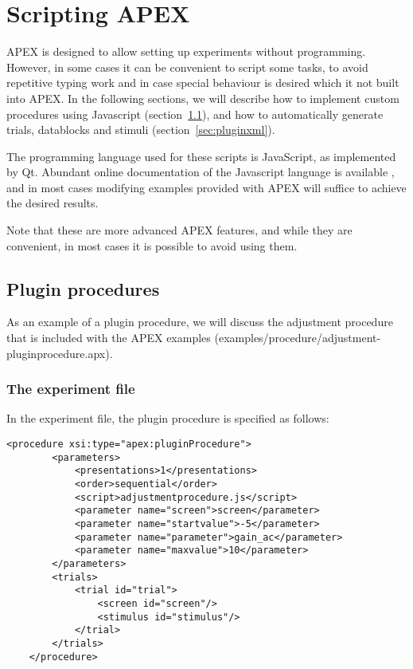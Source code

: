 \chapter{Scripting APEX}
\label{chap:scripting}

APEX is designed to allow setting up experiments without programming. However, in some cases it can be convenient to script some tasks, to avoid repetitive typing work and in case special behaviour is desired which it not built into APEX. In the following sections, we will describe how to implement custom procedures using Javascript (section~\ref{sec:pluginprocedure}), and how to automatically generate trials, datablocks and stimuli (section~\ref{sec:pluginxml}).

The programming language used for these scripts is JavaScript, as implemented by Qt. Abundant online documentation of the Javascript language is available , and in most cases modifying examples provided with APEX will suffice to achieve the desired results.

Note that these are more advanced APEX features, and while they are convenient, in most cases it is possible to avoid using them.

\section{Plugin procedures}
\label{sec:pluginprocedure}

As an example of a plugin procedure, we will discuss the adjustment procedure that is included with the APEX examples (examples/procedure/adjustment-pluginprocedure.apx).

\subsection{The experiment file}

In the experiment file, the plugin procedure is specified as follows:

\begin{lstlisting}
<procedure xsi:type="apex:pluginProcedure">
        <parameters>
            <presentations>1</presentations>
            <order>sequential</order>
            <script>adjustmentprocedure.js</script>
            <parameter name="screen">screen</parameter>
            <parameter name="startvalue">-5</parameter>
            <parameter name="parameter">gain_ac</parameter>
            <parameter name="maxvalue">10</parameter>
        </parameters>
        <trials>
            <trial id="trial">
                <screen id="screen"/>
                <stimulus id="stimulus"/>
            </trial>
        </trials>
    </procedure>
\end{lstlisting}

